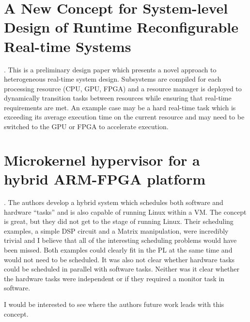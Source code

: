 \documentclass[10pt]{article}
\begin{document}
\section{A New Concept for System-level Design of Runtime Reconfigurable Real-time Systems}
\cite{luppold}. This is a preliminary design paper which presents a novel approach to heterogeneous real-time system design.
Subsystems are compiled for each processing resource (CPU, GPU, FPGA) and a resource manager is deployed to
dynamically transition tasks between resources while ensuring that real-time requirements are met. An example
case may be a hard real-time task which is exceeding its average execution time on the current resource and
may need to be switched to the GPU or FPGA to accelerate execution.

\section{Microkernel hypervisor for a hybrid ARM-FPGA platform}
\cite{micro_hyp}. The authors develop a hybrid system which schedules both software and hardware ``tasks'' and is also
capable of running Linux within a VM. The concept is great, but they did not get to the stage of running Linux. Their
scheduling examples, a simple DSP circuit and a Matrix manipulation, were incredibly trivial and I believe that all
of the interesting scheduling problems would have been missed. Both examples could clearly fit in the PL at the same
time and would not need to be scheduled. It was also not clear whether hardware tasks could be scheduled in parallel
with software tasks. Neither was it clear whether the hardware tasks were independent or if they required a monitor task
in software.

I would be interested to see where the authors future work leads with this concept.




%

\end{document}
